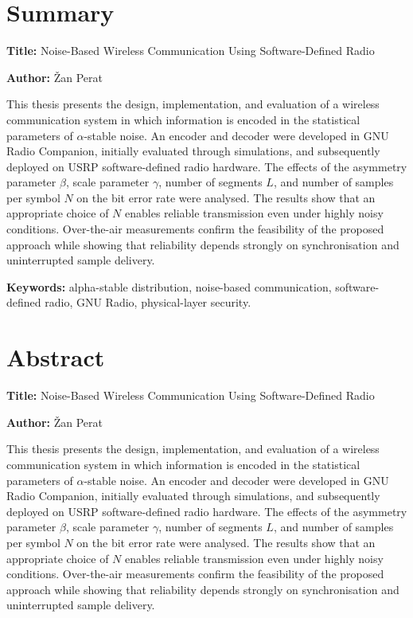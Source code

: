\documentclass[a4paper, 12pt, openany]{book}
\newcommand{\ttitleEn}{Noise-Based Wireless Communication Using Software-Defined Radio}
\newcommand{\tauthor}{Žan Perat}
\newcommand{\tkeywords}{alpha-stable distribution, noise-based communication, software-defined radio, GNU Radio, physical-layer security}
\newcommand{\tkeywordsEn}{\tkeywords}
\newcommand{\clearemptydoublepage}{\newpage{\pagestyle{empty}\cleardoublepage}}
\begin{document}
\clearemptydoublepage

\chapter*{Summary}

\noindent\textbf{Title:} \ttitleEn
\bigskip

\noindent\textbf{Author:} \tauthor
\bigskip

\noindent This thesis presents the design, implementation, and evaluation of a wireless communication system in which information is encoded in the statistical parameters of $\alpha$-stable noise. An encoder and decoder were developed in GNU Radio Companion, initially evaluated through simulations, and subsequently deployed on USRP software-defined radio hardware. The effects of the asymmetry parameter $\beta$, scale parameter $\gamma$, number of segments $L$, and number of samples per symbol $N$ on the bit error rate were analysed. The results show that an appropriate choice of $N$ enables reliable transmission even under highly noisy conditions. Over-the-air measurements confirm the feasibility of the proposed approach while showing that reliability depends strongly on synchronisation and uninterrupted sample delivery.

\bigskip

\noindent\textbf{Keywords:} \tkeywordsEn.
\clearemptydoublepage

\chapter*{Abstract}

\noindent\textbf{Title:} \ttitleEn
\bigskip

\noindent\textbf{Author:} \tauthor
\bigskip

\noindent This thesis presents the design, implementation, and evaluation of a wireless communication system in which information is encoded in the statistical parameters of $\alpha$-stable noise. An encoder and decoder were developed in GNU Radio Companion, initially evaluated through simulations, and subsequently deployed on USRP software-defined radio hardware. The effects of the asymmetry parameter $\beta$, scale parameter $\gamma$, number of segments $L$, and number of samples per symbol $N$ on the bit error rate were analysed. The results show that an appropriate choice of $N$ enables reliable transmission even under highly noisy conditions. Over-the-air measurements confirm the feasibility of the proposed approach while showing that reliability depends strongly on synchronisation and uninterrupted sample delivery.
\bigskip
\end{document}
